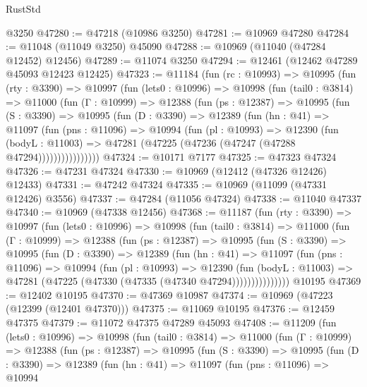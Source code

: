 \begin{lexlean}{RustStd}
\begin{coremodule}
    @3250
@47280 := @47218 (@10986 @3250)
@47281 := @10969 @47280
@47284 := @11048 (@11049 @3250) @45090
@47288 := @10969 (@11040 (@47284 @12452) @12456)
@47289 := @11074 @3250
@47294 := @12461 (@12462 @47289 @45093 @12423 @12425)
@47323 := @11184
    (fun (rc : @10993) =>
    @10995
      (fun (rty : @3390) =>
      @10997
        (fun (lets0 : @10996) =>
        @10998
          (fun (tail0 : @3814) =>
          @11000
            (fun (Γ : @10999) =>
            @12388
              (fun (ps : @12387) =>
              @10995
                (fun (S : @3390) =>
                @10995
                  (fun (D : @3390) =>
                  @12389
                    (fun (hn : @41) =>
                    @11097
                      (fun (pns : @11096) =>
                      @10994
                        (fun (pl : @10993) =>
                        @12390
                          (fun (bodyL : @11003) =>
                          @47281 (@47225 (@47236 (@47247 (@47288 @47294))))))))))))))))
@47324 := @10171 @7177
@47325 := @47323 @47324
@47326 := @47231 @47324
@47330 := @10969 (@12412 (@47326 @12426) @12433)
@47331 := @47242 @47324
@47335 := @10969 (@11099 (@47331 @12426) @3556)
@47337 := @47284 (@11056 @47324)
@47338 := @11040 @47337
@47340 := @10969 (@47338 @12456)
@47368 := @11187
    (fun (rty : @3390) =>
    @10997
      (fun (lets0 : @10996) =>
      @10998
        (fun (tail0 : @3814) =>
        @11000
          (fun (Γ : @10999) =>
          @12388
            (fun (ps : @12387) =>
            @10995
              (fun (S : @3390) =>
              @10995
                (fun (D : @3390) =>
                @12389
                  (fun (hn : @41) =>
                  @11097
                    (fun (pns : @11096) =>
                    @10994
                      (fun (pl : @10993) =>
                      @12390
                        (fun (bodyL : @11003) =>
                        @47281 (@47225 (@47330 (@47335 (@47340 @47294)))))))))))))))
    @10195
@47369 := @12402 @10195
@47370 := @47369 @10987
@47374 := @10969 (@47223 (@12399 (@12401 @47370)))
@47375 := @11069 @10195
@47376 := @12459 @47375
@47379 := @11072 @47375 @47289 @45093
@47408 := @11209
    (fun (lets0 : @10996) =>
    @10998
      (fun (tail0 : @3814) =>
      @11000
        (fun (Γ : @10999) =>
        @12388
          (fun (ps : @12387) =>
          @10995
            (fun (S : @3390) =>
            @10995
              (fun (D : @3390) =>
              @12389
                (fun (hn : @41) =>
                @11097
                  (fun (pns : @11096) =>
                  @10994

\end{coremodule}
\end{lexlean}

